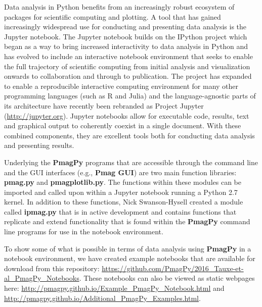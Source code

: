 \documentclass[11pt]{book}
\begin{document}
{{{Data analysis in Python benefits from an increasingly robust ecosystem of packages for scientific computing and plotting. A tool that has gained increasingly widespread use for conducting and presenting data analysis is the Jupyter notebook. The Jupyter notebook builds on the IPython project which began as a way to bring increased interactivity to data analysis in Python \citep{perez07} and has evolved to include an interactive notebook environment that seeks to enable the full trajectory of scientific computing from initial analysis and visualization onwards to collaboration and through to publication. The project has expanded to enable a reproducible interactive computing environment for many other programming languages (such as R and Julia) and the language-agnostic parts of its architecture have recently been rebranded as Project Jupyter (\url{http://jupyter.org}). Jupyter notebooks allow for executable code, results, text and graphical output to coherently coexist in a single document. With these combined components, they are excellent tools both for conducting data analysis and presenting results.

Underlying the {\bf PmagPy}  programs that are accessible through the command line and the GUI interfaces (e.g., {\bf Pmag GUI}) are two main function libraries: {\bf pmag.py} and {\bf pmagplotlib.py}. The functions within these modules can  be imported and called upon within a Jupyter notebook running a Python 2.7 kernel. In addition to these functions, Nick Swanson-Hysell created a module called {\bf ipmag.py} that is in active development and contains functions that replicate and extend functionality that is found within the {\bf PmagPy}  command line programs for use in the notebook environment.

To show some of what is possible in terms of data analysis using {\bf PmagPy} in a notebook environment, we have created example notebooks that are available for download from this repository: \url{https://github.com/PmagPy/2016_Tauxe-et-al_PmagPy_Notebooks}. These notebooks can also be viewed as static webpages here: \url{http://pmagpy.github.io/Example_PmagPy_Notebook.html} and \url{http://pmagpy.github.io/Additional_PmagPy_Examples.html}.

}}}
\end{document}
